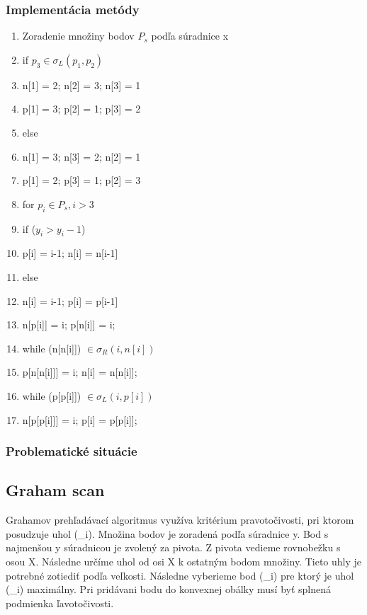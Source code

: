 \documentclass[12pt]{article}
\begin{document}
\subsubsection{Implementácia metódy}
\begin{enumerate}
	\item  Zoradenie množiny bodov $P_s$ podľa súradnice x
	\item if $p_3 \in \sigma_L (p_1, p_2)$
	\item \hspace {1.5cm} n[1] = 2; n[2] = 3; n[3] = 1
	\item \hspace {1.5cm} p[1] = 3; p[2] = 1; p[3] = 2
	\item else
	\item \hspace {1.5cm} n[1] = 3; n[3] = 2; n[2] = 1
	\item \hspace {1.5cm} p[1] = 2; p[3] = 1; p[2] = 3
	\item for $p_i \in P_s, i > 3$
	\item \hspace {1.5cm} if ($y_i>y_i-1$) 
	\item \hspace {2.5cm} p[i] = i-1; n[i] = n[i-1]
	\item \hspace {1.5cm} else 
	\item \hspace {2.5cm} n[i] = i-1; p[i] = p[i-1]
	\item \hspace {1.5cm}n[p[i]] = i; p[n[i]] = i;
	\item \hspace {1.5cm}while (n[n[i]]) $\in \sigma_R (i, n[i]) $
	\item \hspace {2.5cm} p[n[n[i]]] = i; n[i] = n[n[i]];
	\item \hspace {1.5cm} while (p[p[i]]) $\in \sigma_L (i, p[i]) $
	\item \hspace {2.5cm} n[p[p[i]]] = i; p[i] = p[p[i]];
\end{enumerate}
\subsubsection{Problematické situácie}

\subsection {Graham scan}
Grahamov prehľadávací algoritmus využíva kritérium pravotočivosti, pri ktorom posudzuje uhol  (\omega_i). Množina bodov je zoradená podľa súradnice y. Bod s najmenšou y súradnicou je zvolený za pivota. Z pivota vedieme rovnobežku s osou X. Následne určíme uhol od osi X k ostatným bodom množiny. Tieto uhly je potrebné zotiediť podľa veľkosti. Následne vyberieme bod  (\p_i) pre ktorý je uhol  (\omega_i) maximálny. Pri pridávani bodu do konvexnej obálky musí byť splnená podmienka ľavotočivosti.
\end{document}
